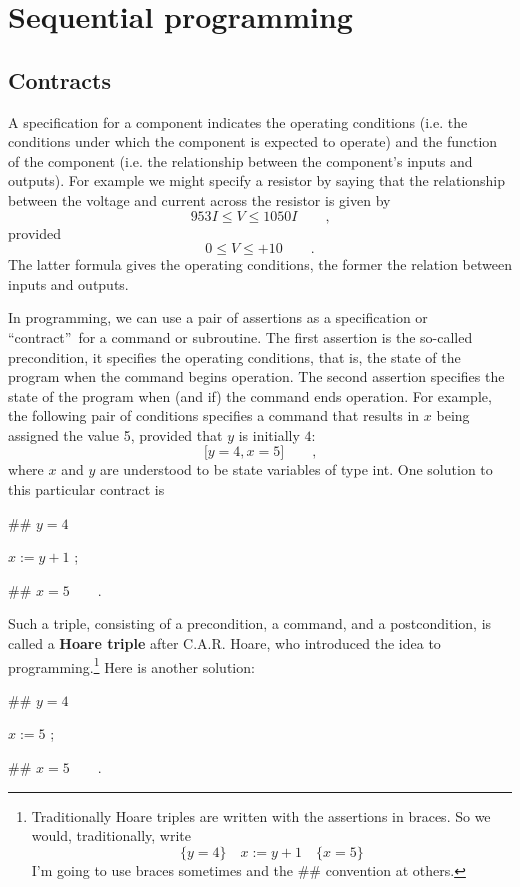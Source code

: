 \documentclass[11pt]{article}%
\begin{document}
\section{Sequential programming\label{seq}}

\subsection{Contracts}

A specification for a component indicates the operating conditions (i.e. the
conditions under which the component is expected to operate) and the function
of the component (i.e. the relationship between the component's inputs and
outputs). For example we might specify a resistor by saying that the
relationship between the voltage and current across the resistor is given by%
\[
953I\leq V\leq1050I\qquad\text{,}%
\]
provided%
\[
0\leq V\leq+10\qquad\text{.}%
\]
The latter formula gives the operating conditions, the former the relation
between inputs and outputs.

In programming, we can use a pair of assertions as a specification or
\textquotedblleft contract\textquotedblright\ for a command or subroutine. The
first assertion is the so-called precondition, it specifies the operating
conditions, that is, the state of the program when the command begins
operation. The second assertion specifies the state of the program when (and
if) the command ends operation. For example, the following pair of conditions
specifies a command that results in $x$ being assigned the value 5, provided
that $y$ is initially $4$:%
\[
\lbrack y=4,x=5]\qquad\text{,}%
\]
where $x$ and $y$ are understood to be state variables of type \textsf{int}.
One solution to this particular contract is

\begin{code}
\#\# $y=4$

$x:=y+1$ ;

\#\# $x=5\qquad$.
\end{code}

\noindent Such a triple, consisting of a precondition, a command, and a
postcondition, is called a \textbf{Hoare triple} after C.A.R. Hoare, who
introduced the idea to programming.\footnote{Traditionally Hoare triples are
written with the assertions in braces. So we would, traditionally, write
\[
\{y=4\}\quad x:=y+1\quad\{x=5\}
\]
I'm going to use braces sometimes and the \#\# convention at others.} Here is
another solution:

\begin{code}
\#\# $y=4$

$x:=5$ ;

\#\# $x=5\qquad$.
\end{code}
\end{document}
